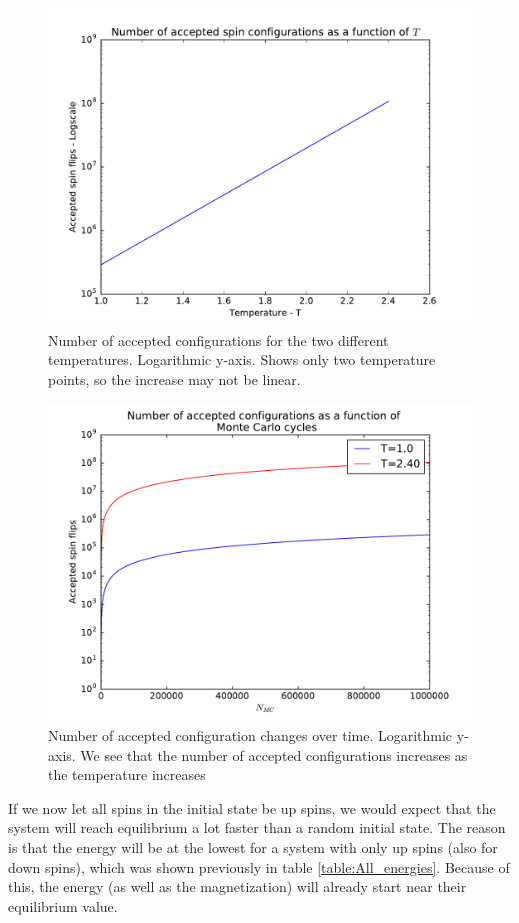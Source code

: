\documentclass[12pt]{article}
\begin{document}
\begin{figure}[H]
\centering
\includegraphics[width=\linewidth]{Plots/Accepted_configs_wrt_temp.pdf}
\caption{Number of accepted configurations for the two different temperatures. Logarithmic y-axis. Shows only two temperature points, so the increase may not be linear.}
\label{fig:Accepted_configs_wrt_temp}
\end{figure}

\begin{figure}[H]
\centering
\includegraphics[width=\linewidth]{Plots/Accepted_configurations_wrt_MC_cycles.pdf}
\caption{Number of accepted configuration changes over time. Logarithmic y-axis. We see that the number of accepted configurations increases as the temperature increases}
\label{fig:Accepted_configs_wrt_MC_cycles}
\end{figure}
If we now let all spins in the initial state be up spins, we would expect that the system will reach equilibrium a lot faster than a random initial state. The reason is that the energy will be at the lowest for a system with only up spins (also for down spins), which was shown previously in table \ref{table:All_energies}. Because of this, the energy (as well as the magnetization) will already start near their equilibrium value.
\end{document}
